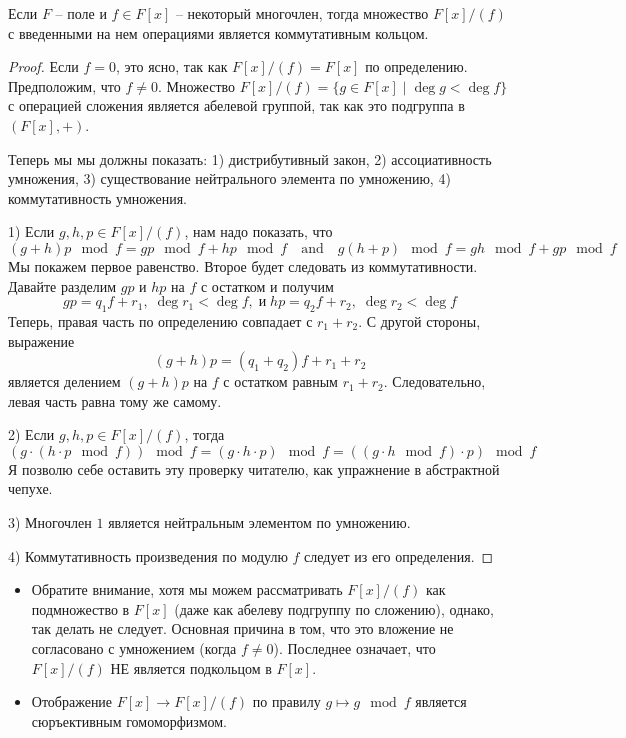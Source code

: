\begin{claim}
\label{claim::PolyRemCorrectness}
Если $F$ -- поле и $f\in F[x]$ -- некоторый многочлен, тогда множество $F[x]/(f)$ с введенными на нем операциями является коммутативным кольцом.
\end{claim}
\begin{proof}
Если $f = 0$, это ясно, так как $F[x]/(f) = F[x]$ по определению.
Предположим, что $f \neq 0$.
Множество $F[x]/(f) = \{g\in F[x]\mid \deg g < \deg f\}$ с операцией сложения является абелевой группой, так как это подгруппа в $(F[x], +)$.

Теперь мы мы должны показать: 1) дистрибутивный закон, 2) ассоциативность умножения, 3) существование нейтрального элемента по умножению, 4) коммутативность умножения.

1) Если $g,h,p\in F[x]/(f)$, нам надо показать, что
\[
(g+h)p\!\!\mod{f} = gp\!\!\mod{f} + hp\!\!\mod{f}\quad\text{and}\quad
g(h+p)\!\!\mod{f} = gh\!\!\mod{f} + gp\!\!\mod{f}
\]
Мы покажем первое равенство.
Второе будет следовать из коммутативности.
Давайте разделим $gp$ и $hp$ на $f$ с остатком и получим
\[
gp = q_1 f + r_1,\;\deg r_1 < \deg f,\;\text{и}\;hp = q_2 f + r_2,\;\deg r_2 < \deg f
\]
Теперь, правая часть по определению совпадает с $r_1 + r_2$.
С другой стороны, выражение
\[
(g+h)p = (q_1 + q_2)f + r_1 + r_2
\]
является делением $(g+h)p$ на $f$ с остатком равным $r_1 + r_2$.
Следовательно, левая часть равна тому же самому.

2) Если $g,h,p\in F[x]/(f)$, тогда 
\[
(g\cdot  (h\cdot  p\!\!\mod{f}))\!\!\mod{f}= (g\cdot  h\cdot  p)\!\!\mod{f} = ((g \cdot h\!\!\mod{f}) \cdot p)\!\!\mod{f}
\]
Я позволю себе оставить эту проверку читателю, как упражнение в абстрактной чепухе.

3) Многочлен $1$ является нейтральным элементом по умножению.

4) Коммутативность произведения по модулю $f$ следует из его определения.
\end{proof}

\begin{remarks}
\begin{itemize}
\item Обратите внимание, хотя мы можем рассматривать  $F[x]/(f)$ как подмножество в $F[x]$ (даже как абелеву подгруппу по сложению), однако, так делать не следует.
Основная причина в том, что это вложение не согласовано с умножением (когда $f \neq 0$).
Последнее означает, что $F[x]/(f)$ НЕ является подкольцом в $F[x]$.

\item Отображение $F[x]\to F[x]/(f)$ по правилу $g\mapsto g\!\!\mod{f}$ является сюръективным гомоморфизмом.
\end{itemize}
\end{remarks}

